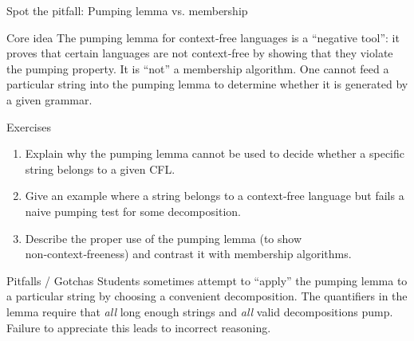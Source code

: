 \begin{frame}[t]{Spot the pitfall: Pumping lemma vs. membership}
  \begin{tblock}{Core idea}
    The pumping lemma for context‑free languages is a “negative tool”:
    it proves that certain languages are not context‑free by showing
    that they violate the pumping property.  It is “not” a membership
    algorithm.  One cannot feed a particular string into the pumping
    lemma to determine whether it is generated by a given grammar.
  \end{tblock}
  \begin{tblock}{Exercises}
    \begin{enumerate}
      \item Explain why the pumping lemma cannot be used to decide
        whether a specific string belongs to a given CFL.
      \item Give an example where a string belongs to a context‑free
        language but fails a naive pumping test for some decomposition.
      \item Describe the proper use of the pumping lemma (to show
        non‑context‑freeness) and contrast it with membership
        algorithms.
    \end{enumerate}
  \end{tblock}
  \begin{talert}{Pitfalls / Gotchas}
    Students sometimes attempt to “apply” the pumping lemma to a
    particular string by choosing a convenient decomposition.  The
    quantifiers in the lemma require that \emph{all} long enough
    strings and \emph{all} valid decompositions pump.  Failure to
    appreciate this leads to incorrect reasoning.
  \end{talert}
  \label{fr:6.3-14}
\end{frame}

